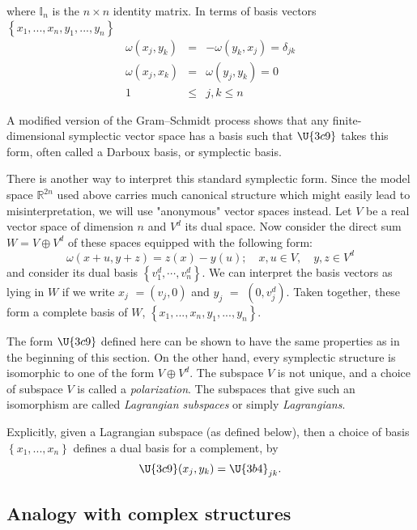 \documentclass{conm-p-l}
\theoremstyle{definition}
\theoremstyle{remark}
\numberwithin{equation}{section}
\theoremstyle{plain}
\begin{document}
where $\mathbb{I}_{n}$ is the $n\times n$ identity matrix. In terms of basis
vectors $\left\{ x_{1},...,x_{n},y_{1},...,y_{n}\right\} $%
\begin{eqnarray}
\omega \left( x_{j},y_{k}\right)  &=&-\omega \left( y_{k},x_{j}\right)
=\delta _{jk} \\
\omega \left( x_{j},x_{k}\right)  &=&\omega \left( y_{j},y_{k}\right) =0 \\
1 &\leq &j,k\leq n
\end{eqnarray}

A modified version of the Gram--Schmidt process shows that any
finite-dimensional symplectic vector space has a basis such that $\U{3c9} $
takes this form, often called a Darboux basis, or symplectic basis.

There is another way to interpret this standard symplectic form. Since the
model space $\mathbb{R}^{2n}$ used above carries much canonical structure
which might easily lead to misinterpretation, we will use "anonymous" vector
spaces instead. Let $V$ be a real vector space of dimension $n$ and $V^{d}$
its dual space. Now consider the direct sum $W=V\oplus V^{d}$ of these
spaces equipped with the following form:%
\begin{equation}
\omega \left( x+u,y+z\right) =z\left( x\right) -y\left( u\right) ;\quad
x,u\in V,\quad y,z\in V^{d}
\end{equation}%
a\TEXTsymbol{\vert}nd consider its dual basis $\left\{ v_{1}^{d},\cdots
,v_{n}^{d}\right\} .$ We can interpret the basis vectors as lying in $W$ if
we write $x_{j}$ $=(v_{j},0)$ and $y_{j}$ $=$ $(0,v_{j}^{d})$. Taken
together, these form a complete basis of $W$, $\left\{
x_{1},...,x_{n},y_{1},...,y_{n}\right\} $.

The form $\U{3c9} $ defined here can be shown to have the same properties as
in the beginning of this section. On the other hand, every symplectic
structure is isomorphic to one of the form $V\oplus V^{d}$. The subspace $V$
is not unique, and a choice of subspace $V$ is called a \emph{polarization}.
The subspaces that give such an isomorphism are called \emph{Lagrangian
subspaces} or simply \emph{Lagrangians}.

Explicitly, given a Lagrangian subspace (as defined below), then a choice of
basis $\left\{ x_{1},...,x_{n}\right\} $ defines a dual basis for a
complement, by%
\begin{equation}
\U{3c9} (x_{j},y_{k})=\U{3b4} _{jk}.
\end{equation}

\subsection{Analogy with complex structures}
\end{document}
